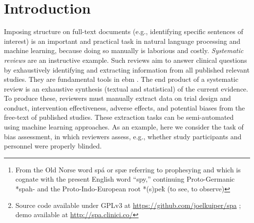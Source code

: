 \documentclass[runningheads,a4paper]{llncs}
\begin{document}
\begin{abstract}
Summarizing the evidence concerning medical interventions is an immense undertaking, in part because unstructured \ac{pdf} documents remain the main vehicle for disseminating the results of clinical trials.
Clinicians and researchers must therefore manually extract and synthesise information from these \acp{pdf}s to be published in \emph{systematic reviews}.
We introduce Spá,\footnote{From the Old Norse word spá or spæ referring to prophesying and which is cognate with the present English word “spy,” continuing Proto-Germanic *spah- and the Proto-Indo-European root *(s)pe\`{k} (to see, to observe)}\footnote{Source code available under GPLv3 at \url{https://github.com/joelkuiper/spa} \cite{kuiper2014}; demo available at \url{http://spa.clinici.co/}} a web-based viewer that enables automated annotation and summarisation of \ac{pdf}s via \ac{ml}.
To illustrate its functionalility, here we use Spá to semi-automate the assessment of bias in clinical trials.
Spá can visualize the output from hybrid models that simultaneously classify documents (e.g., identifying trials as low or high risk of various biases), and annotate sentences that support these classifications.
The Spá architecture is modular and new models may be trivially added, thus the tool made be widely useful in other domains with a \ac{pdf}-based literature, including law, physics, and biology.

\end{abstract}

\acresetall
{}

\section{Introduction}
\label{section:intro}

Imposing structure on full-text documents (e.g., identifying specific sentences of interest) is an important and practical task in natural language processing and machine learning, because doing so manually is laborious and costly.
\emph{Systematic reviews} are an instructive example.
Such reviews aim to answer clinical questions by exhaustively identifying and extracting information from all published relevant studies.
They are fundamental tools in \ac{ebm} \cite{sackett1996}.
The end product of a systematic review is an exhaustive synthesis (textual and statistical) of the current evidence.
To produce these, reviewers must manually extract data on trial design and conduct, intervention effectiveness, adverse effects, and potential biases from the free-text of published studies.
These extraction tasks can be semi-automated using machine learning approaches.
As an example, here we consider the task of bias assessment, in which reviewers assess, e.g., whether study participants and personnel were properly blinded.
\end{document}
